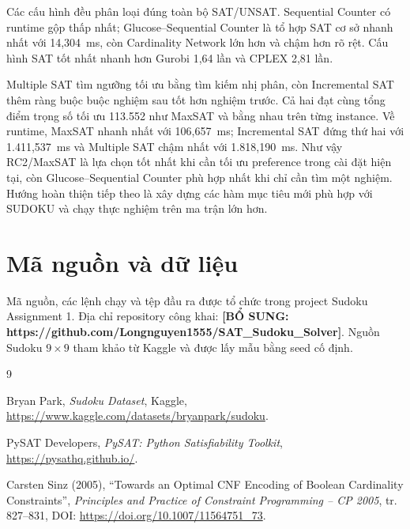 \documentclass[a4paper,fleqn]{cas-sc}
\newcommand{\noteedit}[1]{\textbf{[BỔ SUNG: #1]}}
\begin{document}
Các cấu hình đều phân loại đúng toàn bộ SAT/UNSAT. Sequential Counter có runtime gộp thấp nhất; Glucose--Sequential Counter là tổ hợp SAT cơ sở nhanh nhất với 14,304~ms, còn Cardinality Network lớn hơn và chậm hơn rõ rệt. Cấu hình SAT tốt nhất nhanh hơn Gurobi 1,64 lần và CPLEX 2,81 lần.

Multiple SAT tìm ngưỡng tối ưu bằng tìm kiếm nhị phân, còn Incremental SAT thêm ràng buộc buộc nghiệm sau tốt hơn nghiệm trước. Cả hai đạt cùng tổng điểm trọng số tối ưu 113.552 như MaxSAT và bằng nhau trên từng instance. Về runtime, MaxSAT nhanh nhất với 106,657~ms; Incremental SAT đứng thứ hai với 1.411,537~ms và Multiple SAT chậm nhất với 1.818,190~ms. Như vậy RC2/MaxSAT là lựa chọn tốt nhất khi cần tối ưu preference trong cài đặt hiện tại, còn Glucose--Sequential Counter phù hợp nhất khi chỉ cần tìm một nghiệm. Hướng hoàn thiện tiếp theo là xây dựng các hàm mục tiêu mới phù hợp với SUDOKU và chạy thực nghiệm trên ma trận lớn hơn.

\section*{Mã nguồn và dữ liệu}
Mã nguồn, các lệnh chạy và tệp đầu ra được tổ chức trong project Sudoku Assignment 1. Địa chỉ repository công khai: \noteedit{https://github.com/Longnguyen1555/SAT\_Sudoku\_Solver}. Nguồn Sudoku $9\times9$ tham khảo từ Kaggle \cite{kaggle_sudoku} và được lấy mẫu bằng seed cố định.

\begin{thebibliography}{9}

Bryan Park, \textit{Sudoku Dataset}, Kaggle, \url{https://www.kaggle.com/datasets/bryanpark/sudoku}.

PySAT Developers, \textit{PySAT: Python Satisfiability Toolkit}, \url{https://pysathq.github.io/}.

Carsten Sinz (2005), ``Towards an Optimal CNF Encoding of Boolean Cardinality Constraints'', \textit{Principles and Practice of Constraint Programming -- CP 2005}, tr. 827--831, DOI: \url{https://doi.org/10.1007/11564751_73}.

\end{thebibliography}

\appendix
\end{document}
